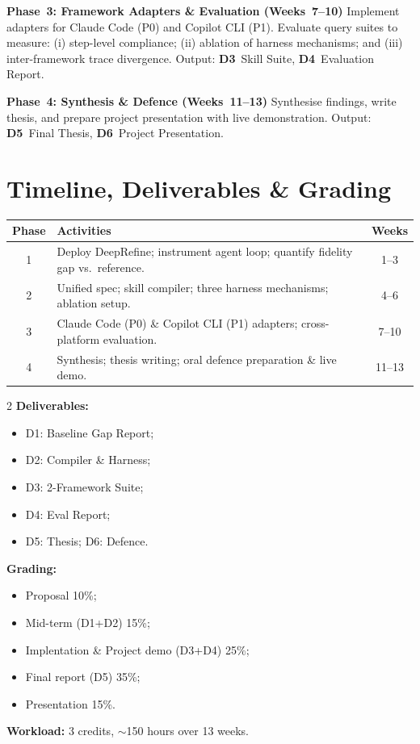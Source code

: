 \documentclass[10pt,a4paper]{article}
\begin{document}
\textbf{Phase~3: Framework Adapters \& Evaluation (Weeks~7--10)} Implement adapters for Claude Code (P0) and Copilot CLI (P1). Evaluate query suites to measure: (i) step-level compliance; (ii) ablation of harness mechanisms; and (iii) inter-framework trace divergence. Output: \textbf{D3}~Skill Suite, \textbf{D4}~Evaluation Report.

\textbf{Phase~4: Synthesis \& Defence (Weeks~11--13)} Synthesise findings, write thesis, and prepare project presentation with live demonstration. Output: \textbf{D5}~Final Thesis, \textbf{D6}~Project Presentation.

\section{Timeline, Deliverables \& Grading}
\begin{table}[ht!]
\small
\begin{tabularx}{\textwidth}{@{}c|X|c@{}}
\hline
\textbf{Phase} & \textbf{Activities} & \textbf{Weeks} \\
\hline
1 & Deploy DeepRefine; instrument agent loop; quantify fidelity gap vs.~reference. & 1--3 \\
2 & Unified spec; skill compiler; three harness mechanisms; ablation setup. & 4--6 \\
3 & Claude Code (P0) \& Copilot CLI (P1) adapters; cross-platform evaluation. & 7--10 \\
4 & Synthesis; thesis writing; oral defence preparation \& live demo. & 11--13 \\
\hline
\end{tabularx}
\end{table}

\vspace{-6pt}
\begin{multicols}{2}
\textbf{Deliverables:}
\begin{itemize}
    \item D1: Baseline Gap Report;
    \item D2: Compiler \& Harness;
    \item D3: 2-Framework Suite;
    \item D4: Eval Report;
    \item D5: Thesis; D6: Defence.
\end{itemize}
\columnbreak

\textbf{Grading:}
\begin{itemize}
    \item Proposal 10\%;
    \item Mid-term (D1+D2) 15\%;
    \item Implentation \& Project demo (D3+D4) 25\%;
    \item Final report (D5) 35\%;
    \item Presentation 15\%.
\end{itemize}
\end{multicols}
\vspace{2pt}
\textbf{Workload:} 3 credits, $\sim$150 hours over 13 weeks.
\end{document}
